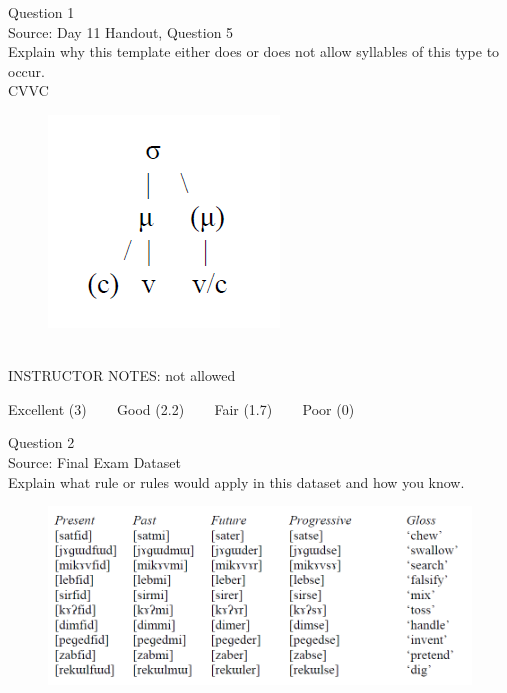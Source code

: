 \documentclass[12pt]{article}
\begin{document}
{\large Question 1}\\

Source: Day 11 Handout, Question 5\\

Explain why this template either does or does not allow syllables of this type to occur.\\

CVVC

\begin{figure}[H]
\includegraphics{../images/ponapean_syllabletemplate.png}
\end{figure}

~\\
INSTRUCTOR NOTES: not allowed


\vfill
Excellent (3) ~~~ Good (2.2) ~~~ Fair (1.7) ~~~ Poor (0)
\newpage

{\large Question 2}\\

Source: Final Exam Dataset\\

Explain what rule or rules would apply in this dataset and how you know.\\

\begin{figure}[H]
\includegraphics{../images/final_dataset.png}
\end{figure}
\end{document}
